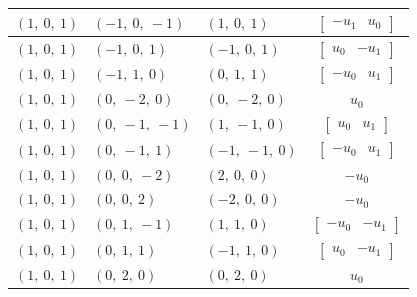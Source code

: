 \documentclass[11pt]{article}
\theoremstyle{definition}
\begin{document}
\begin{longtable}{|l|l|l|c|}
    \hline
    $\left( 1, \  0, \  1\right)$ & $\left( -1, \  0, \  -1\right)$ & $\left( 1, \  0, \  1\right)$ & $\left[\begin{matrix}- u_{1} & u_{0}\end{matrix}\right]$ \\
    \hline
    $\left( 1, \  0, \  1\right)$ & $\left( -1, \  0, \  1\right)$ & $\left( -1, \  0, \  1\right)$ & $\left[\begin{matrix}u_{0} & - u_{1}\end{matrix}\right]$ \\
    \hline
    $\left( 1, \  0, \  1\right)$ & $\left( -1, \  1, \  0\right)$ & $\left( 0, \  1, \  1\right)$ & $\left[\begin{matrix}- u_{0} & u_{1}\end{matrix}\right]$ \\
    \hline
    $\left( 1, \  0, \  1\right)$ & $\left( 0, \  -2, \  0\right)$ & $\left( 0, \  -2, \  0\right)$ & $u_{0}$ \\
    \hline
    $\left( 1, \  0, \  1\right)$ & $\left( 0, \  -1, \  -1\right)$ & $\left( 1, \  -1, \  0\right)$ & $\left[\begin{matrix}u_{0} & u_{1}\end{matrix}\right]$ \\
    \hline
    $\left( 1, \  0, \  1\right)$ & $\left( 0, \  -1, \  1\right)$ & $\left( -1, \  -1, \  0\right)$ & $\left[\begin{matrix}- u_{0} & u_{1}\end{matrix}\right]$ \\
    \hline
    $\left( 1, \  0, \  1\right)$ & $\left( 0, \  0, \  -2\right)$ & $\left( 2, \  0, \  0\right)$ & $- u_{0}$ \\
    \hline
    $\left( 1, \  0, \  1\right)$ & $\left( 0, \  0, \  2\right)$ & $\left( -2, \  0, \  0\right)$ & $- u_{0}$ \\
    \hline
    $\left( 1, \  0, \  1\right)$ & $\left( 0, \  1, \  -1\right)$ & $\left( 1, \  1, \  0\right)$ & $\left[\begin{matrix}- u_{0} & - u_{1}\end{matrix}\right]$ \\
    \hline
    $\left( 1, \  0, \  1\right)$ & $\left( 0, \  1, \  1\right)$ & $\left( -1, \  1, \  0\right)$ & $\left[\begin{matrix}u_{0} & - u_{1}\end{matrix}\right]$ \\
    \hline
    $\left( 1, \  0, \  1\right)$ & $\left( 0, \  2, \  0\right)$ & $\left( 0, \  2, \  0\right)$ & $u_{0}$ \\

\end{longtable}
\end{document}
